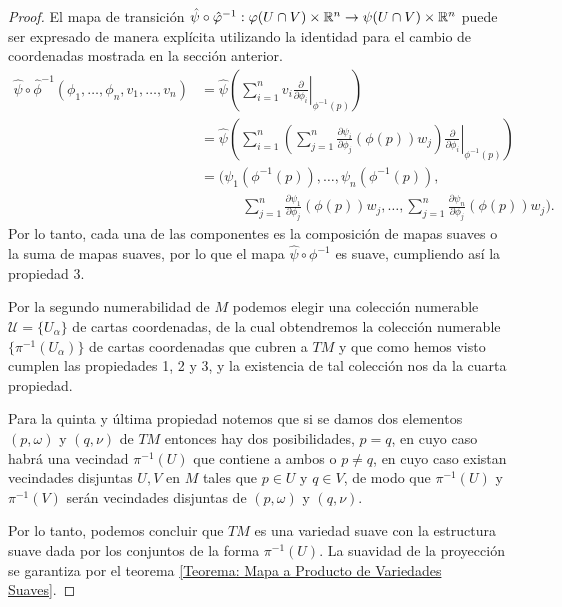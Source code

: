 \begin{proof}
	El mapa de transición $\hat{\psi} \circ \hat{\varphi}^{-1}: \varphi(U \cap V) \times \mathbb{R}^n \to \psi(U \cap V) \times \mathbb{R}^n$ puede ser expresado de manera explícita utilizando la identidad para el cambio de coordenadas mostrada en la sección anterior.
	\begin{align*}
		\hat{\psi} \circ \hat{\phi}^{-1}
		(\phi_1, \dots, \phi_n, v_1, \dots, v_n)
		 & =
		\hat{\psi} \left( \left.
		\sum_{i=1}^{n} v_i \frac{\partial}{\partial \phi_i}
		\right|_{\phi^{-1}(p)}\right)                      \\
		 & =
		\hat{\psi}\left(
		\sum_{i=1}^{n}
		\left(
		\sum_{j=1}^{n}
		\frac{\partial \psi_i}{\partial \phi_j} (\phi(p)) w_j
		\right)
		\left.
		\frac{\partial}{\partial \phi_i}
		\right|_{\phi^{-1}(p)}
		\right)
		\\
		 & =
		\Biggl(
		\psi_1(\phi^{-1}(p)), \dots, \psi_n(\phi^{-1}(p)), \\
		 & \quad \hspace{24pt}
		\sum_{j=1}^{n} \frac{\partial \psi_1}{\partial \phi_j}(\phi(p))w_j,
		\dots,
		\sum_{j=1}^{n} \frac{\partial \psi_n}{\partial \phi_j}(\phi(p))w_j
		\Biggr).
	\end{align*}
	Por lo tanto, cada una de las componentes es la composición de mapas suaves o la suma de mapas suaves, por lo que el mapa $\hat{\psi} \circ \phi^{-1}$ es suave, cumpliendo así la propiedad 3.

	Por la segundo numerabilidad de $M$ podemos elegir una colección numerable $\mathcal{U} = \{U_\alpha\}$ de cartas coordenadas, de la cual obtendremos la colección numerable $\{\pi^{-1}(U_\alpha)\}$ de cartas coordenadas que cubren a $TM$ y que como hemos visto cumplen las propiedades 1, 2 y 3, y la existencia de tal colección nos da la cuarta propiedad.

	Para la quinta y última propiedad notemos que si se damos dos elementos $(p,\omega)$ y $(q, \nu)$ de $TM$ entonces hay dos posibilidades, $p = q$, en cuyo caso habrá una vecindad $\pi^{-1}(U)$ que contiene a ambos o $p \neq q$, en cuyo caso existan vecindades disjuntas $U,V$ en $M$ tales que $p \in U$ y $q \in V$, de modo que $\pi^{-1}(U)$ y $\pi^{-1}(V)$ serán vecindades disjuntas de $(p,\omega)$ y $(q,\nu)$.

	Por lo tanto, podemos concluir que $TM$ es una variedad suave con la estructura suave dada por los conjuntos de la forma $\pi^{-1}(U)$. La suavidad de la proyección se garantiza por el teorema \ref{Teorema: Mapa a Producto de Variedades Suaves}.
\end{proof}

